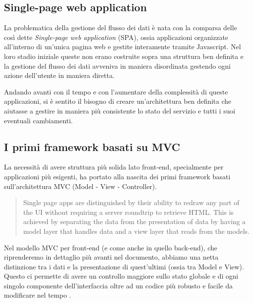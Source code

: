 \subsection{Single-page web application}
La problematica della gestione del flusso dei dati è nata con la comparsa delle così dette \textit{Single-page web application} (SPA), ossia applicazioni organizzate all'interno di un'unica pagina web e gestite interamente tramite Javascript.
Nel loro stadio iniziale queste non erano costruite sopra una struttura ben definita e la gestione del flusso dei dati avveniva in maniera disordinata gestendo ogni azione dell'utente in maniera diretta.

Andando avanti con il tempo e con l'aumentare della complessità di queste applicazioni, si è sentito il bisogno di creare un'architettura ben definita che aiutasse a gestire in maniera più consistente lo stato del servizio e tutti i suoi eventuali cambiamenti.

\subsection{I primi framework basati su MVC}
La necessità di avere struttura più solida lato front-end, specialmente per applicazioni più esigenti, ha portato alla nascita dei primi framework basati sull'architettura MVC (Model - View - Controller).

\blockquote{Single page apps are distinguished by their ability to redraw any part of the UI without requiring a server roundtrip to retrieve HTML. This is achieved by separating the data from the presentation of data by having a model layer that handles data and a view layer that reads from the models. \cite{MixuSinglePageWebApp}}

\noindent Nel modello MVC per front-end (e come anche in quello back-end), che riprenderemo in dettaglio più avanti nel documento, abbiamo una netta distinzione tra i dati e la presentazione di quest'ultimi (ossia tra Model e View). Questo ci permette di avere un controllo maggiore sullo stato globale e di ogni singolo componente dell'interfaccia oltre ad un codice più robusto e facile da modificare nel tempo \cite{ParrOnTheMVC}.


